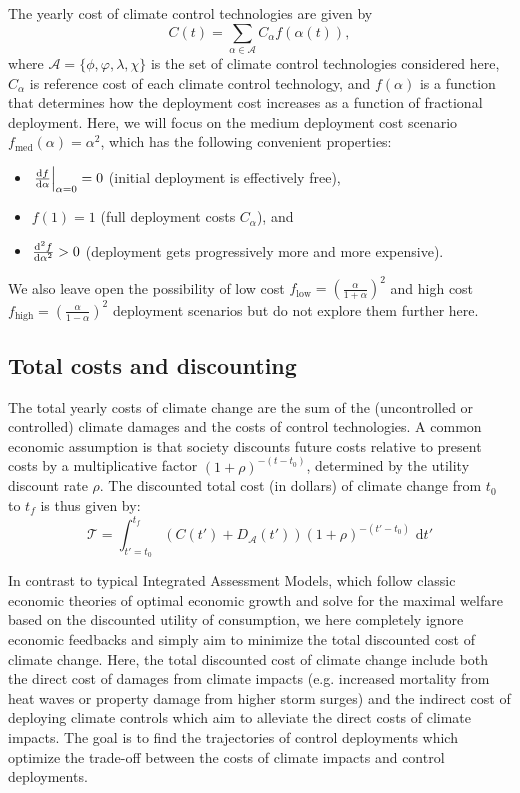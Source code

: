 \documentclass{article}
\begin{document}
The yearly cost of climate control technologies are given by
\begin{equation}
    C(t) = \sum_{\alpha \in \mathcal{A}} C_{\alpha} f(\alpha(t)),
\end{equation}
where $\mathcal{A} = \{ \phi, \varphi, \lambda, \chi \}$ is the set of climate control technologies considered here, $C_{\alpha}$ is reference cost of each climate control technology, and $f(\alpha)$ is a function that determines how the deployment cost increases as a function of fractional deployment. Here, we will focus on the medium deployment cost scenario $f_{\text{med}}(\alpha) = \alpha^{2}$, which has the following convenient properties: 
\begin{itemize}
    \item $\left. \dv{f}{\alpha}\right|_{\alpha=0} = 0$ (initial deployment is effectively free),
    \item $f(1) = 1$ (full deployment costs $C_{\alpha}$), and
    \item $\dv[2]{f}{\alpha} > 0$ (deployment gets progressively more and more expensive).
\end{itemize}
We also leave open the possibility of low cost $f_{\text{low}} = \left( \frac{\alpha}{1+\alpha} \right)^{2}$ and high cost $f_{\text{high}} = \left( \frac{\alpha}{1-\alpha} \right)^{2}$ deployment scenarios but do not explore them further here. 

\subsection{Total costs and discounting}

The total yearly costs of climate change are the sum of the (uncontrolled or controlled) climate damages and the costs of control technologies. A common economic assumption is that society discounts future costs relative to present costs by a multiplicative factor $(1 + \rho)^{-(t-t_{0})}$, determined by the utility discount rate $\rho$. The discounted total cost (in dollars) of climate change from $t_{0}$ to $t_{f}$ is thus given by:
\begin{equation}
    \mathcal{T} =
    \int_{t'=t_{0}}^{t_{f}}
    (C(t') + D_{\mathcal{A}}(t')) (1 + \rho)^{-(t'-t_{0})} \text{ d}t'
\end{equation}

In contrast to typical Integrated Assessment Models, which follow classic economic theories of optimal economic growth and solve for the maximal welfare based on the discounted utility of consumption, we here completely ignore economic feedbacks and simply aim to minimize the total discounted cost of climate change. Here, the total discounted cost of climate change include both the direct cost of damages from climate impacts (e.g. increased mortality from heat waves or property damage from higher storm surges) and the indirect cost of deploying climate controls which aim to alleviate the direct costs of climate impacts. The goal is to find the trajectories of control deployments which optimize the trade-off between the costs of climate impacts and control deployments.
\end{document}
